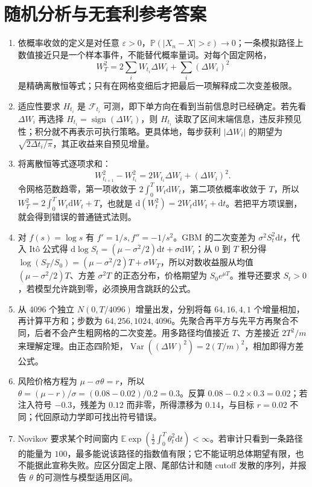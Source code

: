 \chapter{随机分析与无套利参考答案}

\begin{enumerate}[leftmargin=*]
  \item 依概率收敛的定义是对任意 $\varepsilon>0$，$\mathbb P(|X_n-X|>\varepsilon)\to0$；一条模拟路径上数值接近只是一个样本事件，不能替代概率量词。对每个固定网格，
  \[
  W_T^2=2\sum_iW_{t_i}\Delta W_i+\sum_i(\Delta W_i)^2
  \]
  是精确离散恒等式；只有在网格变细后才把最后一项解释成二次变差极限。
  \item 适应性要求 $H_{t_i}$ 是 $\mathcal F_{t_i}$ 可测，即下单方向在看到当前信息时已经确定。若先看 $\Delta W_i$ 再选择 $H_{t_i}=\operatorname{sign}(\Delta W_i)$，则 $H_{t_i}$ 读取了区间末端信息，违反非预见性；积分就不再表示可执行策略。更具体地，每步获利 $|\Delta W_i|$ 的期望为 $\sqrt{2\Delta t_i/\pi}$，其正收益来自预见增量。
  \item 将离散恒等式逐项求和：
  \[
  W_{t_{i+1}}^2-W_{t_i}^2=2W_{t_i}\Delta W_i+(\Delta W_i)^2.
  \]
  令网格范数趋零，第一项收敛于 $2\int_0^TW_t\mathrm dW_t$，第二项依概率收敛于 $T$，所以
  $W_T^2=2\int_0^TW_t\mathrm dW_t+T$，也就是 $\mathrm d(W_t^2)=2W_t\mathrm dW_t+\mathrm dt$。若把平方项误删，就会得到错误的普通链式法则。
  \item 对 $f(s)=\log s$ 有 $f'=1/s,f''=-1/s^2$。GBM 的二次变差为 $\sigma^2S_t^2\mathrm dt$，代入 Itô 公式得 $\mathrm d\log S_t=(\mu-\sigma^2/2)\mathrm dt+\sigma\mathrm dW_t$；从 $0$ 到 $T$ 积分得 $\log(S_T/S_0)=(\mu-\sigma^2/2)T+\sigma W_T$，所以对数收益服从均值 $(\mu-\sigma^2/2)T$、方差 $\sigma^2T$ 的正态分布，价格期望为 $S_0e^{\mu T}$。推导还要求 $S_t>0$，若模型允许跳到零，必须换用含跳跃的公式。
  \item 从 4096 个独立 $N(0,T/4096)$ 增量出发，分别将每 $64,16,4,1$ 个增量相加，再计算平方和；步数为 $64,256,1024,4096$。先聚合再平方与先平方再聚合不同，后者不会产生粗网格的二次变差。用多路径均值接近 $T$、方差接近 $2T^2/m$ 来理解定理。由正态四阶矩，$\operatorname{Var}((\Delta W)^2)=2(T/m)^2$，相加即得方差公式。
  \item 风险价格方程为 $\mu-\sigma\theta=r$，所以 $\theta=(\mu-r)/\sigma=(0.08-0.02)/0.2=0.3$。反算 $0.08-0.2\times0.3=0.02$；若注入符号 $-0.3$，残差为 $0.12$ 而非零，所得漂移为 $0.14$，与目标 $r=0.02$ 不同；代回原动力学即可找出符号错误。
  \item Novikov 要求某个时间窗内 $\mathbb E\exp(\frac12\int_0^T\theta_t^2\mathrm dt)<\infty$。若审计只看到一条路径的能量为 $100$，最多能说该路径的指数值有限；它不能证明总体期望有限，也不能据此宣称失败。应区分固定上限、尾部估计和随 cutoff 发散的序列，并报告 $\theta$ 的可测性与模型适用区间。
\end{enumerate}


\MFQMappedDerivativesStochasticSolutions
